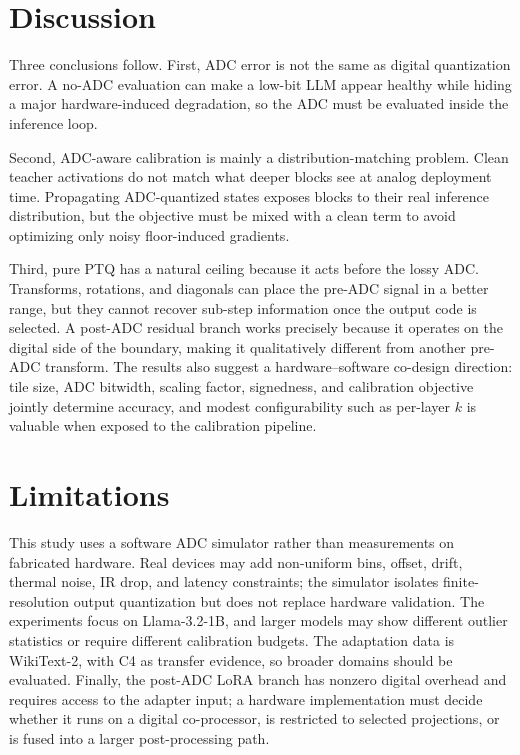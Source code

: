 \documentclass[letterpaper]{article} %
\theoremstyle{plain}
\begin{document}
\section{Discussion}

Three conclusions follow. First, ADC error is not the same as digital quantization error. A no-ADC evaluation can make a low-bit LLM appear healthy while hiding a major hardware-induced degradation, so the ADC must be evaluated inside the inference loop.

Second, ADC-aware calibration is mainly a distribution-matching problem. Clean teacher activations do not match what deeper blocks see at analog deployment time. Propagating ADC-quantized states exposes blocks to their real inference distribution, but the objective must be mixed with a clean term to avoid optimizing only noisy floor-induced gradients.

Third, pure PTQ has a natural ceiling because it acts before the lossy ADC. Transforms, rotations, and diagonals can place the pre-ADC signal in a better range, but they cannot recover sub-step information once the output code is selected. A post-ADC residual branch works precisely because it operates on the digital side of the boundary, making it qualitatively different from another pre-ADC transform. The results also suggest a hardware--software co-design direction: tile size, ADC bitwidth, scaling factor, signedness, and calibration objective jointly determine accuracy, and modest configurability such as per-layer $k$ is valuable when exposed to the calibration pipeline.

\section{Limitations}

This study uses a software ADC simulator rather than measurements on fabricated hardware. Real devices may add non-uniform bins, offset, drift, thermal noise, IR drop, and latency constraints; the simulator isolates finite-resolution output quantization but does not replace hardware validation. The experiments focus on Llama-3.2-1B, and larger models may show different outlier statistics or require different calibration budgets. The adaptation data is WikiText-2, with C4 as transfer evidence, so broader domains should be evaluated. Finally, the post-ADC LoRA branch has nonzero digital overhead and requires access to the adapter input; a hardware implementation must decide whether it runs on a digital co-processor, is restricted to selected projections, or is fused into a larger post-processing path.
\end{document}
